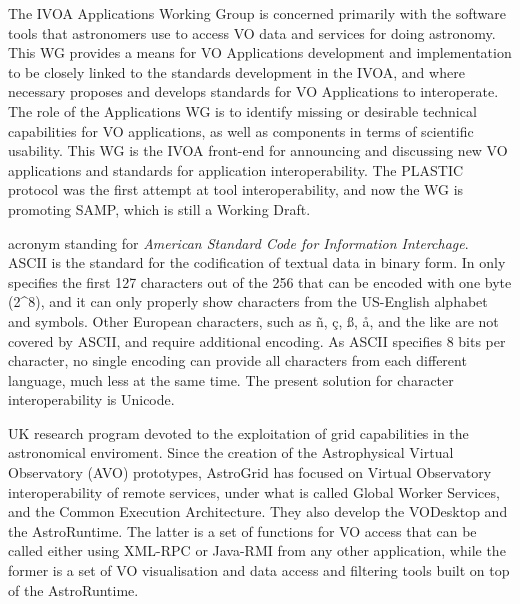 {
    	The \gls{IVOA} Applications Working Group is concerned
        primarily with the software tools that astronomers use to
        access VO data and services for doing astronomy. This WG
        provides a means for VO Applications development and
        implementation to be closely linked to the standards
        development in the IVOA, and where necessary proposes and
        develops standards for VO Applications to interoperate. The
        role of the Applications WG is to identify missing or desirable
        technical capabilities for VO applications, as well as
        components in terms of scientific usability. This WG is the
        IVOA front-end for announcing and discussing new VO
        applications and standards for application interoperability.
        The \gls{PLASTIC} protocol was the first attempt at tool
        interoperability, and now the WG is promoting \gls{SAMP},
        which is still a \gls{Working Draft}.
}

{
    	acronym standing for \emph{American Standard Code for
        Information Interchage}. ASCII is the standard for the
        codification of textual data in binary form. In only specifies
        the first 127 characters out of the 256 that can be encoded
        with one byte (2^8), and it can only properly show characters
        from the US-English alphabet and symbols. Other European
        characters, such as ñ, ç, ß, å, and the like are not covered by
        ASCII, and require additional encoding. As ASCII specifies 8
        bits per character, no single encoding can provide all
        characters from each different language, much less at the same
        time. The present solution for character interoperability is
        \gls{Unicode}.
}

{
    	UK research program devoted to the exploitation of grid
        capabilities in the astronomical enviroment. Since the creation
        of the Astrophysical Virtual Observatory (AVO) prototypes,
        AstroGrid has focused on \gls{Virtual Observatory}
        interoperability of remote services, under what is called
        Global Worker Services, and the Common Execution Architecture.
        They also develop the VODesktop and the AstroRuntime. The
        latter is a set of functions for VO access that can be called
        either using \gls{XML-RPC} or \gls{Java-RMI} from any
        other application, while the former is a set of VO
        visualisation and data access and filtering tools built on top
        of the \gls{AstroRuntime}.
}

